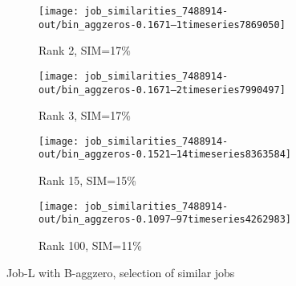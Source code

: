 \documentclass{jhps}
\begin{document}
\begin{figure}[bt]
\begin{subfigure}{0.47\textwidth}
\centering
\texttt{[image: job\_similarities\_7488914-out/bin\_aggzeros-0.1671--1timeseries7869050]}
\caption{Rank 2, SIM=17\%}
\end{subfigure}
\begin{subfigure}{0.47\textwidth}
\centering
\texttt{[image: job\_similarities\_7488914-out/bin\_aggzeros-0.1671--2timeseries7990497]}
\caption{Rank 3, SIM=17\%}
\end{subfigure}
\begin{subfigure}{0.47\textwidth}
\texttt{[image: job\_similarities\_7488914-out/bin\_aggzeros-0.1521--14timeseries8363584]}
\caption{Rank 15, SIM=15\%}
\end{subfigure}
\begin{subfigure}{0.47\textwidth}
\centering
\texttt{[image: job\_similarities\_7488914-out/bin\_aggzeros-0.1097--97timeseries4262983]}
\caption{Rank 100, SIM=11\%}
\end{subfigure}

\caption{Job-L with B-aggzero, selection of similar jobs}%
\label{fig:job-L-bin-aggzero}
\end{figure}

%
%
\end{document}
